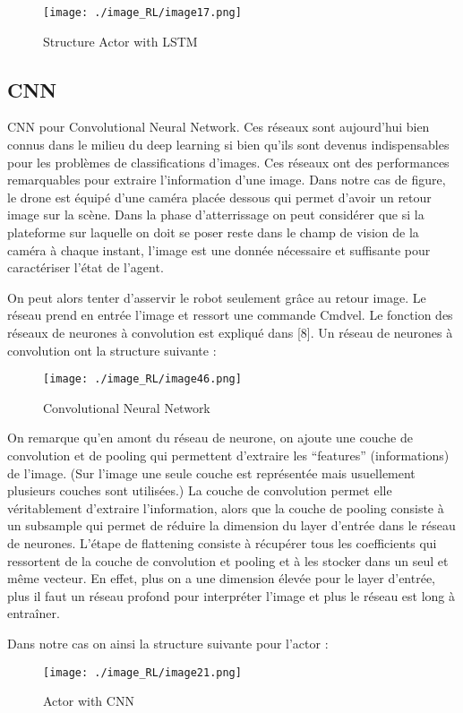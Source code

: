 \begin{figure}[H]
    \centering
    \texttt{[image: ./image\_RL/image17.png]}
    \caption{Structure Actor with LSTM}
\end{figure}

\subsection{CNN}

CNN pour Convolutional Neural Network. Ces réseaux sont aujourd’hui bien connus dans le milieu du deep learning si bien qu'ils sont devenus indispensables pour les problèmes de classifications d’images.
Ces réseaux ont des performances remarquables pour extraire l’information d’une image.
Dans notre cas de figure, le drone est équipé d’une caméra placée dessous qui permet d’avoir un retour image sur la scène.
Dans la phase d'atterrissage on peut considérer que si la plateforme sur laquelle on doit se poser reste dans le champ de vision de la caméra à chaque instant, l’image est une donnée nécessaire et suffisante pour caractériser l’état de l’agent.

On peut alors tenter d’asservir le robot seulement grâce au retour image.
Le réseau prend en entrée l’image et ressort une commande Cmdvel.
Le fonction des réseaux de neurones à convolution est expliqué dans [8].
Un réseau de neurones à convolution ont la structure suivante\cite{CONV} :
\begin{figure}[H]
    \centering
    \texttt{[image: ./image\_RL/image46.png]}
    \caption{Convolutional Neural Network  }
\end{figure}

On remarque qu’en amont du réseau de neurone, on ajoute une couche de convolution et de pooling qui permettent d’extraire les “features” (informations) de l’image. 
(Sur l’image une seule couche est représentée mais usuellement plusieurs couches sont utilisées.)
La couche de convolution permet elle véritablement d’extraire l’information, alors que la couche de pooling consiste à un subsample qui permet de réduire la dimension du layer d’entrée dans le réseau de neurones.
L’étape de flattening consiste à récupérer tous les coefficients qui ressortent de la couche de convolution et pooling et à les stocker dans un seul et même vecteur.
En effet, plus on a une dimension élevée pour le layer d'entrée, plus il faut un réseau profond pour interpréter l’image et plus le réseau est long à entraîner.

Dans notre cas on ainsi la structure suivante pour l’actor :

\begin{figure}[H]
    \centering
    \texttt{[image: ./image\_RL/image21.png]}
    \caption{ Actor with CNN }
\end{figure}
